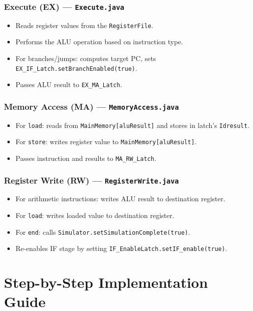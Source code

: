 \documentclass[12pt,a4paper]{article}
\begin{document}
\subsubsection{Execute (EX) --- \texttt{Execute.java}}
\begin{itemize}
    \item Reads register values from the \texttt{RegisterFile}.
    \item Performs the ALU operation based on instruction type.
    \item For branches/jumps: computes target PC, sets \texttt{EX\_IF\_Latch.setBranchEnabled(true)}.
    \item Passes ALU result to \texttt{EX\_MA\_Latch}.
\end{itemize}

\subsubsection{Memory Access (MA) --- \texttt{MemoryAccess.java}}
\begin{itemize}
    \item For \texttt{load}: reads from \texttt{MainMemory[aluResult]} and stores in latch's \texttt{Idresult}.
    \item For \texttt{store}: writes register value to \texttt{MainMemory[aluResult]}.
    \item Passes instruction and results to \texttt{MA\_RW\_Latch}.
\end{itemize}

\subsubsection{Register Write (RW) --- \texttt{RegisterWrite.java}}
\begin{itemize}
    \item For arithmetic instructions: writes ALU result to destination register.
    \item For \texttt{load}: writes loaded value to destination register.
    \item For \texttt{end}: calls \texttt{Simulator.setSimulationComplete(true)}.
    \item Re-enables IF stage by setting \texttt{IF\_EnableLatch.setIF\_enable(true)}.
\end{itemize}

\section{Step-by-Step Implementation Guide}
\end{document}
